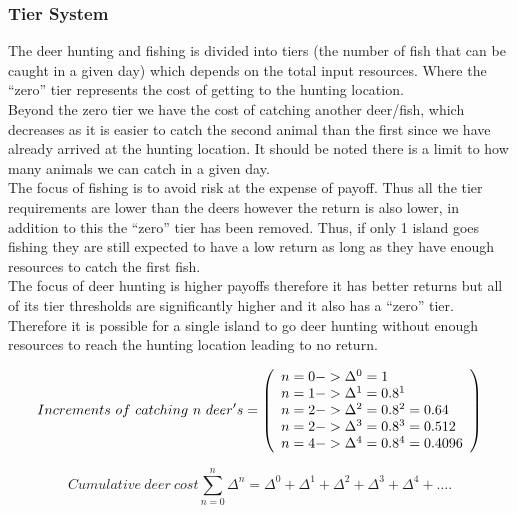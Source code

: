 \subsubsection{Tier System}

The deer hunting and fishing is divided into tiers (the number of fish that can be caught in a given day) which depends on the total input resources. Where the “zero” tier represents the cost of getting to the hunting location.\\ 

Beyond the zero tier we have the cost of catching another deer/fish, which decreases as it is easier to catch the second animal than the first since we have already arrived at the hunting location. It should be noted there is a limit to how many animals we can catch in a given day.\\

The focus of fishing is to avoid risk at the expense of payoff. Thus all the tier requirements are lower than the deers however the return is also lower, in addition to this the “zero” tier has been removed. Thus, if only 1 island goes fishing they are still expected to have a low return as long as they have enough resources to catch the first fish. \\

The focus of deer hunting is higher payoffs therefore it has better returns but all of its tier thresholds are significantly higher and it also has a “zero” tier. Therefore it is possible for a single island to go deer hunting without enough resources to reach the hunting location leading to no return.

\begin{equation}
Increments\ of\ catching\ n\ deer's=
\left( \begin{array}{ll@{}}
n=0 -> \Delta^0 = 1 \\
n=1 -> \Delta^1 = 0.8^1 \\
n=2 -> \Delta^2 = 0.8^2 = 0.64 \\
n=2 -> \Delta^3 = 0.8^3 = 0.512 \\
n=4 -> \Delta^4 = 0.8^4 = 0.4096\\
\end{array} \right) 
\end{equation}

\begin{equation}
Cumulative\ deer \ cost \sum_{n=0}^{n} \Delta^{n} = \Delta^{0} + \Delta^{1} + \Delta^{2} + \Delta^{3} + \Delta^{4} + ....
\end{equation}

